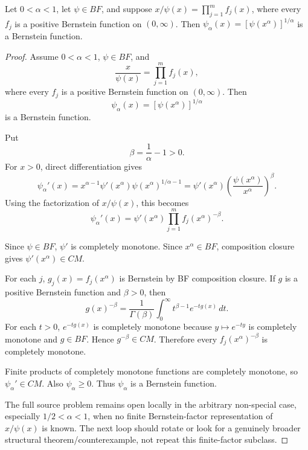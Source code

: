 \begin{proposition}
\label{res:gt-bf-factorized-denominator-power-closure}
Let \(0<\alpha<1\), let \(\psi\in BF\), and suppose \(x/\psi(x)=\prod_{j=1}^m f_j(x)\), where every \(f_j\) is a positive Bernstein function on \((0,\infty)\). Then \(\psi_\alpha(x)=[\psi(x^\alpha)]^{1/\alpha}\) is a Bernstein function.
\end{proposition}
\begin{proof}
Assume \(0<\alpha<1\), \(\psi\in BF\), and
\[
\frac{x}{\psi(x)}=\prod_{j=1}^m f_j(x),
\]
where every \(f_j\) is a positive Bernstein function on \((0,\infty)\). Then
\[
\psi_\alpha(x)=[\psi(x^\alpha)]^{1/\alpha}
\]
is a Bernstein function.

Put
\[
\beta=\frac1\alpha-1>0.
\]
For \(x>0\), direct differentiation gives
\[
\psi_\alpha'(x)
=x^{\alpha-1}\psi'(x^\alpha)\psi(x^\alpha)^{1/\alpha-1}
=\psi'(x^\alpha)\left(\frac{\psi(x^\alpha)}{x^\alpha}\right)^\beta.
\]
Using the factorization of \(x/\psi(x)\), this becomes
\[
\psi_\alpha'(x)
=\psi'(x^\alpha)\prod_{j=1}^m f_j(x^\alpha)^{-\beta}.
\]

Since \(\psi\in BF\), \(\psi'\) is completely monotone. Since \(x^\alpha\in BF\), composition closure gives \(\psi'(x^\alpha)\in CM\).

For each \(j\), \(g_j(x)=f_j(x^\alpha)\) is Bernstein by BF composition closure. If \(g\) is a positive Bernstein function and \(\beta>0\), then
\[
g(x)^{-\beta}
=\frac1{\Gamma(\beta)}
\int_0^\infty t^{\beta-1}e^{-t g(x)}\,dt.
\]
For each \(t>0\), \(e^{-t g(x)}\) is completely monotone because \(y\mapsto e^{-ty}\) is completely monotone and \(g\in BF\). Hence \(g^{-\beta}\in CM\). Therefore every \(f_j(x^\alpha)^{-\beta}\) is completely monotone.

Finite products of completely monotone functions are completely monotone, so \(\psi_\alpha'\in CM\). Also \(\psi_\alpha\ge0\). Thus \(\psi_\alpha\) is a Bernstein function.

The full source problem remains open locally in the arbitrary non-special case, especially \(1/2<\alpha<1\), when no finite Bernstein-factor representation of \(x/\psi(x)\) is known. The next loop should rotate or look for a genuinely broader structural theorem/counterexample, not repeat this finite-factor subclass.
\end{proof}

